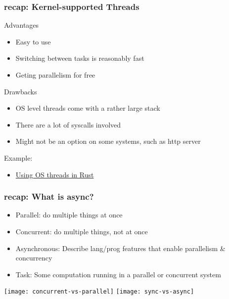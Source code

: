 \begin{frame}[fragile]
	\frametitle{recap: Kernel-supported Threads}
	{\color{red}Advantages}
	
	\begin{itemize}
		\item Easy to use
		\item Switching between tasks is reasonably fast
		\item Geting parallelism for free
	\end{itemize}
	
	{\color{red}Drawbacks}
	
	\begin{itemize}
		\item OS level threads come with a rather large stack
		\item There are a lot of syscalls involved
		\item Might not be an option on some systems, such as http server
	\end{itemize}
	
	Example:
	
	\begin{itemize}
		\item \href{https://cfsamson.github.io/books-futures-explained/0_background_information.html#threads-provided-by-the-operating-system}{Using OS threads in Rust}
	\end{itemize}
	
\end{frame}
\begin{frame}[fragile]	
	\frametitle{recap: What is async?}
	
	\begin{itemize}
		\item Parallel: do multiple things at once
		\item Concurrent: do multiple things, not at once
		\item Asynchronous: Describe lang/prog features that enable
		parallelism \& concurrency
		\item Task: Some 		computation running in a		parallel or concurrent system
	\end{itemize}	

    \centering


    \texttt{[image: concurrent-vs-parallel]}
	\texttt{[image: sync-vs-async]}
\end{frame}


